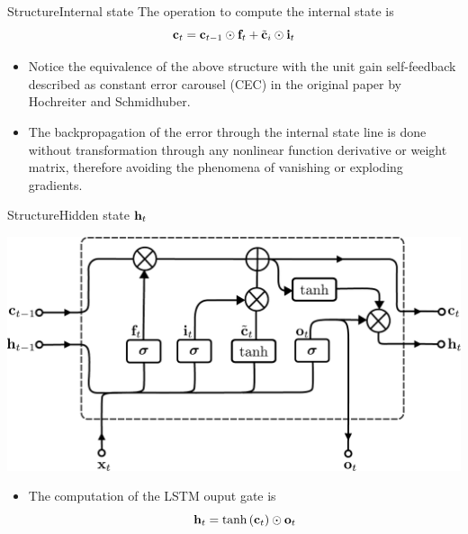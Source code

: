 \documentclass{beamer}
\begin{document}
\begin{frame}{Structure}{Internal state}
The operation to compute the internal state is 
    \begin{equation}
    {\bf c}_t = {\bf c}_{t-1} \odot {\bf f}_t + \tilde{{\bf c}}_i \odot {\bf i}_t
\end{equation}
\begin{itemize}
    \item Notice the equivalence of the above structure with  the unit gain self-feedback described as constant error carousel (CEC) in the
original paper by Hochreiter and Schmidhuber. 
\item The backpropagation of the error through the internal state line is done without transformation through any nonlinear function derivative or weight matrix, therefore avoiding the phenomena of vanishing or exploding gradients.
\end{itemize}
\end{frame}
\begin{frame}{Structure}{Hidden state ${\bf h}_t$}
\begin{center}
 \includegraphics[scale=0.4]{Module 5 (RNN)/pics/Long_Short-Term_Memory.pdf}
 \end{center} 
 \begin{itemize}
 \item The computation of the LSTM ouput gate is
\begin{equation}
{\bf h}_t = \tanh\left({\bf c}_t \right) \odot {\bf o}_t 
\end{equation}
\end{itemize}
\end{frame}
\end{document}
